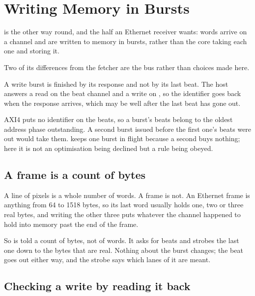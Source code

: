 \section{Writing Memory in Bursts}
\label{sec:x-dmaw}

 is  the other way round, and the
half an Ethernet receiver wants: words arrive on a channel and are
written to memory in bursts, rather than the core taking each one and
storing it.

Two of its differences from the fetcher are the bus rather than
choices made here.

A write burst is finished by its response and not by its last beat.
The host answers a read on the beat channel and a write on
, so the identifier goes back when the response arrives,
which may be well after the last beat has gone out.

AXI4 puts no identifier on the beats, so a burst's beats belong to
the oldest address phase outstanding. A second burst issued before
the first one's beats were out would take them. 
keeps one burst in flight because a second buys nothing; here it is
not an optimisation being declined but a rule being obeyed.

\subsection{A frame is a count of bytes}

A line of pixels is a whole number of words. A frame is not. An
Ethernet frame is anything from 64 to 1518 bytes, so its last word
usually holds one, two or three real bytes, and writing the other
three puts whatever the channel happened to hold into memory
past the end of the frame.

So  is told a count of bytes, not of words. It asks
for  beats and strobes the last one down to
the bytes that are real. Nothing about the burst changes; the beat
goes out either way, and the strobe says which lanes of it are meant.



\subsection{Checking a write by reading it back}

